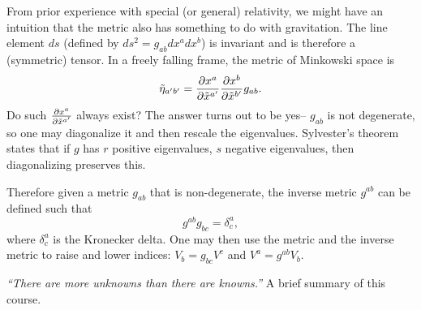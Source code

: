 From prior experience with special (or general) relativity, we might have an intuition that the metric also has something to do with gravitation. The line element $ds$ (defined by $ds^2 = g_{ab}dx^a dx^b$) is invariant and is therefore a (symmetric) tensor. In a freely falling frame, the metric of Minkowski space is $$\tilde \eta_{a'b'} = \frac{\partial x^a}{\partial\tilde x^{a'}}\frac{\partial x^b}{\partial \tilde x^{b'} }g_{ab}.$$ Do such $\frac{\partial x^a}{\partial\tilde x^{a'}}$ always exist? The answer turns out to be yes-- $g_{ab}$ is not degenerate, so one may diagonalize it and then rescale the eigenvalues. Sylvester's theorem states that if $g$ has $r$ positive eigenvalues, $s$ negative eigenvalues, then diagonalizing preserves this.%

Therefore given a metric $g_{ab}$ that is non-degenerate, the inverse metric $g^{ab}$ can be defined such that 
\begin{equation}
g^{ab}g_{bc}=\delta^a_c,
\end{equation} where $\delta^a_c$ is the Kronecker delta. One may then use the metric and the inverse metric to raise and lower indices:
$V_b=g_{bc}V^c$ and $V^a = g^{ab}V_b$.

\textit{``There are more unknowns than there are knowns.''} A brief summary of this course.